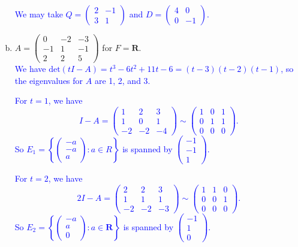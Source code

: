 \documentclass[a4paper,11pt]{article}
\newcommand{\R}{\mathbf{R}}
\newcommand{\ddet}{\text{det}}
\newcommand{\blue}[1]{\textcolor{blue}{#1}}
\begin{document}
\begin{enumerate}[(a)]
  \blue{We may take $Q=\left( \begin{smallmatrix}2&-1\\3&1\end{smallmatrix}
    \right)$ and $D=\left( \begin{smallmatrix}4&0\\0&-1\end{smallmatrix}
    \right)$. \\}
  
\item $A=\left( \begin{smallmatrix}0&-2&-3\\-1&1&-1\\2&2&5\end{smallmatrix}
  \right)$ for $F=\R$. \\

  \blue{We have $\ddet(tI-A)=t^3-6t^2+11t-6=(t-3)(t-2)(t-1)$, so the eigenvalues
    for $A$ are 1, 2, and 3.}

  \blue{For $t=1$, we have
    \[
      I-A =
      \left(
        \begin{array}{rrr}
          1&2&3\\
          1&0&1\\
          -2&-2&-4
        \end{array}
      \right)
      \sim
      \left(
        \begin{array}{rrr}
          1&0&1\\
          0&1&1\\
          0&0&0
        \end{array}
      \right).
    \]
    So $E_1=\left\{ \left( \begin{smallmatrix}-a\\-a\\a\end{smallmatrix} \right)
    : a \in R\right\}$ is spanned by
  $\left( \begin{smallmatrix}-1\\-1\\1\end{smallmatrix} \right)$.}

\blue{For $t=2$, we have
  \[
    2I-A =
    \left(
      \begin{array}{rrr}
        2&2&3\\
        1&1&1\\
        -2&-2&-3
      \end{array}
    \right)
    \sim
    \left(
      \begin{array}{rrr}
        1&1&0\\
        0&0&1\\
        0&0&0
      \end{array}
    \right).
  \]
  So $E_2=\left\{ \left( \begin{smallmatrix}-a\\a\\0\end{smallmatrix} \right) :
    a \in \R \right\}$ is spanned by
  $\left( \begin{smallmatrix}-1\\1\\0\end{smallmatrix} \right)$.}


\end{enumerate}
\end{document}
